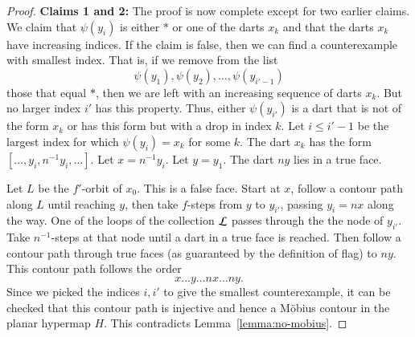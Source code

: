 \begin{proof}

{\bf Claims 1 and 2:} %
The proof is now complete except for two earlier claims.  We claim
that $\psi(y_i)$ is either $*$ or one of the darts $x_k$ and that the darts
$x_k$ have increasing indices.  If the claim is false, then
we can find a counterexample with smallest index.  That is, if we remove
from the list
   $$
   \psi(y_1),\psi(y_2),\ldots,\psi(y_{i'-1})
   $$
those that equal $*$, then we are left with an increasing sequence of 
darts $x_k$.  But no larger index $i'$ has this property.  Thus, either
$\psi(y_{i'})$ is a dart that is not of the form $x_k$ or has this form
but with a drop in index $k$.  Let $i\le i'-1$
be the largest index for which $\psi(y_i)=x_k$ for some $k$.
The dart $x_k$ has the form $[\ldots,y_i,n^{-1}y_i,\ldots]$.  Let $x=n^{-1}y_i$.
Let $y=y_1$.  The dart $n y$ lies in a true face.

Let $L$ be the $f'$-orbit of $x_0$.  This is a false face.
Start at $x$, follow a contour path along $L$ until reaching $y$, then
take $f$-steps from $y$ to $y_{i'}$, passing $y_i = n x$ along the way.
One of the loops of the collection ${\cal L}$ passes through the the node of $y_{i'}$.
Take $n^{-1}$-steps at that node until a dart in a true face is reached.  Then
follow a contour path through true faces (as guaranteed by the definition
of flag) to $n y$.  
This contour path follows the order
  $$
  x\ldots y \ldots n x\ldots n y.
  $$
Since we picked the indices $i,i'$ to give the smallest counterexample, it can be checked
that this contour path is injective and hence a M\"obius contour in 
the planar hypermap $H$.  
This contradicts Lemma~\ref{lemma:no-mobius}.
\end{proof}



